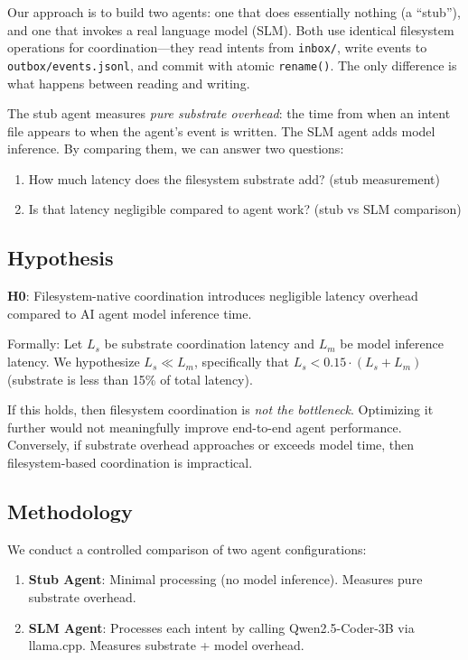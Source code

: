 \documentclass[11pt]{article}
\begin{document}
Our approach is to build two agents: one that does essentially nothing (a ``stub''), and one that invokes a real language model (SLM). Both use identical filesystem operations for coordination---they read intents from \texttt{inbox/}, write events to \texttt{outbox/events.jsonl}, and commit with atomic \texttt{rename()}. The only difference is what happens between reading and writing.

The stub agent measures \emph{pure substrate overhead}: the time from when an intent file appears to when the agent's event is written. The SLM agent adds model inference. By comparing them, we can answer two questions:
\begin{enumerate}
\item How much latency does the filesystem substrate add? (stub measurement)
\item Is that latency negligible compared to agent work? (stub vs SLM comparison)
\end{enumerate}

\subsection{Hypothesis}

\textbf{H0}: Filesystem-native coordination introduces negligible latency overhead compared to AI agent model inference time.

Formally: Let $L_s$ be substrate coordination latency and $L_m$ be model inference latency. We hypothesize $L_s \ll L_m$, specifically that $L_s < 0.15 \cdot (L_s + L_m)$ (substrate is less than 15\% of total latency).

If this holds, then filesystem coordination is \emph{not the bottleneck}. Optimizing it further would not meaningfully improve end-to-end agent performance. Conversely, if substrate overhead approaches or exceeds model time, then filesystem-based coordination is impractical.

\subsection{Methodology}

We conduct a controlled comparison of two agent configurations:

\begin{enumerate}
\item \textbf{Stub Agent}: Minimal processing (no model inference). Measures pure substrate overhead.
\item \textbf{SLM Agent}: Processes each intent by calling Qwen2.5-Coder-3B via llama.cpp. Measures substrate + model overhead.
\end{enumerate}
\end{document}

